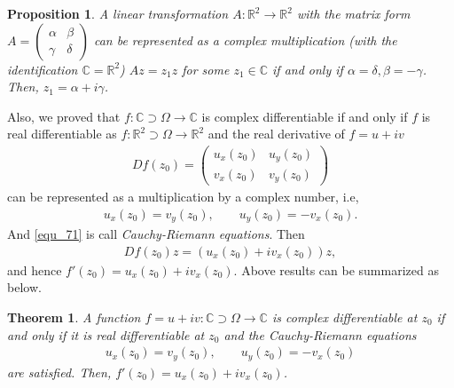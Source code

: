 \documentclass[11pt]{book}
\newtheorem{theorem}{Theorem}[chapter]
\newtheorem{proposition}{Proposition}[chapter]
\theoremstyle{definition}
\numberwithin{equation}{chapter}
\begin{document}
\medskip

\begin{proposition}
A linear transformation $A: \mathbb{R}^2 \to \mathbb{R}^2$ with the matrix form $A = \begin{pmatrix} \alpha & \beta \\ \gamma & \delta \end{pmatrix}$ can be represented as a complex multiplication (with the identification $\mathbb{C} = \mathbb{R}^2$) $Az = z_1 z$ for some $z_1 \in \mathbb{C}$ if and only if $\alpha = \delta, \beta = - \gamma$. Then, $z_1 = \alpha + i \gamma$. 
\end{proposition}

\medskip

Also, we proved that $f: \mathbb{C} \supset \Omega \to \mathbb{C}$ is complex differentiable if and only if $f$ is real differentiable as $f: \mathbb{R}^2 \supset \Omega \to \mathbb{R}^2$ and the real derivative of $f = u + iv$
\begin{align*}
    Df(z_0) = \begin{pmatrix} u_x(z_0) & u_y(z_0) \\ v_x(z_0) & v_y(z_0) \end{pmatrix}
\end{align*}
can be represented as a multiplication by a complex number, i.e, 
\begin{align}\label{equ_71}
    u_x(z_0) = v_y(z_0), \qquad u_y(z_0) = - v_x(z_0).
\end{align}
And \eqref{equ_71} is call {\it Cauchy-Riemann equations}. Then 
\begin{align*}
    Df(z_0) z = \left(u_x(z_0) + i v_x(z_0)\right) z,
\end{align*}
and hence $f'(z_0) = u_x(z_0) + i v_x(z_0)$. Above results can be summarized as below.

\medskip

\begin{theorem}
A function $f = u + iv: \mathbb{C} \supset \Omega \to \mathbb{C}$ is complex differentiable at $z_0$ if and only if it is real differentiable at $z_0$ and the Cauchy-Riemann equations
\begin{align*}
    u_x(z_0) = v_y(z_0), \qquad u_y(z_0) = - v_x(z_0)
\end{align*}
are satisfied. Then, $f'(z_0) = u_x(z_0) + i v_x(z_0)$.
\end{theorem}

\medskip
\end{document}
